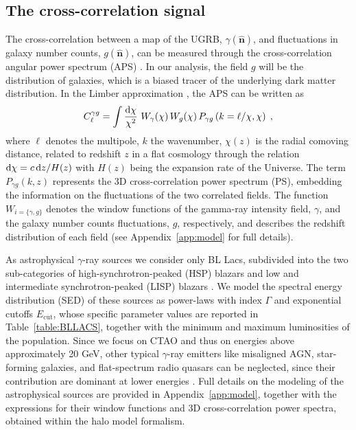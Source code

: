 \subsection{The cross-correlation signal}
\label{sec:formalism}

The cross-correlation between a map of the UGRB, $\gamma(\hat{\bm n})$, and fluctuations in galaxy number counts, $g(\hat{\bm n})$, can be measured through the cross-correlation angular power spectrum (APS) \cite{Camera:2012cj,Camera_2015,Fornengo:2013rga}. In our analysis, the field $g$ will be the distribution of galaxies, which is a biased tracer of the underlying dark matter distribution. 
In the Limber approximation \citep{Limber:1953apj,1992ApJ...388..272K,1998ApJ...498...26K}, the APS can be written as~{\cite{Camera:2012cj,Camera_2015,Fornengo:2013rga}}
\begin{equation}
 C_\ell^{\gamma g}=\int \frac{\textrm{d}\chi}{\chi^2}\,\,W_{\gamma}(\chi)\, W_g(\chi)\,P_{\gamma g}\left(k=\ell/\chi,\chi\right)\;,
\label{eq:clfin}    
\end{equation}
%
 where $\ell$ denotes the multipole, $k$ the wavenumber, $\chi(z)$ is the radial comoving distance, related to redshift $z$ in a flat cosmology through the relation $\textrm{d}\chi=c\,\textrm{d} z/H(z)$ with $H(z)$ being the expansion rate of the Universe. The term $P_{\gamma g}(k,z)$ represents the 3D cross-correlation power spectrum (PS), embedding the information on the fluctuations of the two correlated fields. The function $W_{i=\{\gamma,g\}}$ denotes the window functions of the gamma-ray intensity field, $\gamma$, and the galaxy number counts fluctuations, $g$, {respectively, and describes the redshift distribution of each field} (see Appendix~\ref{app:model} for full details).
 
As astrophysical $\gamma$-ray sources we consider only BL Lacs, subdivided into the two sub-categories of high-synchrotron-peaked (HSP) blazars and low and intermediate synchrotron-peaked (LISP) blazars \cite{DiMauro:2013zfa}.
We model the spectral energy distribution (SED) of these sources as power-laws with index $\varGamma$ and exponential cutoffs $E_\textrm{cut}$, whose specific parameter values are reported in Table~\ref{table:BLLACS}, together with the minimum and maximum luminosities of the population.
Since we focus on CTAO and thus on energies above approximately {20} GeV, 
other typical $\gamma$-ray emitters like misaligned AGN, star-forming galaxies, and flat-spectrum radio quasars can be neglected, since their contribution are dominant at lower energies \cite{DGRB-review}. Full details on the modeling of the astrophysical sources are provided in Appendix~\ref{app:model}, together with the expressions for their window functions and 3D cross-correlation power spectra, obtained within the halo model formalism.

